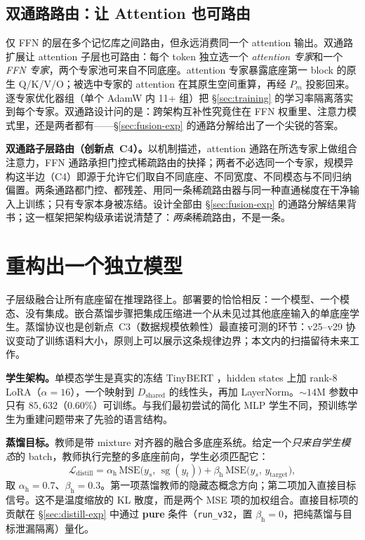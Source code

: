 \documentclass[10pt,twoside]{article}
\newcommand{\stopgrad}{\operatorname{sg}}
\begin{document}
\subsection{双通路路由：让 Attention 也可路由}
\label{sec:dualpath}

仅 FFN 的层在多个记忆库之间路由，但永远消费同一个 attention 输出。双通路扩展让 attention 子层也可路由：每个 token 独立选一个 \emph{attention 专家}和一个 \emph{FFN 专家}，两个专家池可来自不同底座。attention 专家暴露底座第一 block 的原生 Q/K/V/O；被选中专家的 attention 在其原生空间重算，再经 $P_m$ 投影回来。逐专家优化器组（单个 AdamW 内 11+ 组）把 \S\ref{sec:training} 的学习率隔离落实到每个专家。双通路设计问的是：跨架构互补性究竟住在 FFN 权重里、注意力模式里，还是两者都有——\S\ref{sec:fusion-exp} 的通路分解给出了一个尖锐的答案。

\textbf{双通路子层路由（创新点~C4）。}以机制描述，attention 通路在所选专家上做组合注意力，FFN 通路承担门控式稀疏路由的抉择；两者不必选同一个专家，规模异构这半边（C4）即源于允许它们取自不同底座、不同宽度、不同模态与不同归纳偏置。两条通路都门控、都残差、用同一条稀疏路由器与同一种直通梯度在干净输入上训练；只有专家本身被冻结。设计全部由 \S\ref{sec:fusion-exp} 的通路分解结果背书；这一框架把架构级承诺说清楚了：\emph{两条}稀疏路由，不是一条。

\section{重构出一个独立模型}
\label{sec:distill}

子层级融合让所有底座留在推理路径上。部署要的恰恰相反：一个模型、一个模态、没有集成。嵌合蒸馏步骤把集成压缩进一个从未见过其他底座输入的单底座学生。蒸馏协议也是创新点~C3（数据规模依赖性）最直接可测的环节：v25--v29 协议变动了训练语料大小，原则上可以展示这条规律边界；本文内的扫描留待未来工作。

\textbf{学生架构。}单模态学生是真实的冻结 TinyBERT \citep{jiao2020}，hidden states 上加 rank-8 LoRA（$\alpha{=}16$），一个映射到 $D_{\text{shared}}$ 的线性头，再加 LayerNorm。${\sim}14$M 参数中只有 $85{,}632$（$0.60\%$）可训练。与我们最初尝试的简化 MLP 学生不同，预训练学生为重建问题带来了先验的语言结构。

\textbf{蒸馏目标。}教师是带 mixture 对齐器的融合多底座系统。给定一个\emph{只来自学生模态}的 batch，教师执行完整的多底座前向，学生必须匹配它：
\begin{equation}
\label{eq:distill}
\mathcal{L}_{\text{distill}} = \alpha_{\text{h}} \, \mathrm{MSE}\big(y_s,\, \stopgrad(y_t)\big) + \beta_{\text{h}} \, \mathrm{MSE}\big(y_s,\, y_{\text{target}}\big),
\end{equation}
取 $\alpha_{\text{h}} = 0.7$、$\beta_{\text{h}} = 0.3$。第一项蒸馏教师的隐藏态概念方向；第二项加入直接目标信号。这不是温度缩放的 KL 散度，而是两个 MSE 项的加权组合。直接目标项的贡献在 \S\ref{sec:distill-exp} 中通过 \textbf{pure} 条件（\texttt{run\_v32}，置 $\beta_{\text{h}}=0$，把纯蒸馏与目标泄漏隔离）量化。
\end{document}
